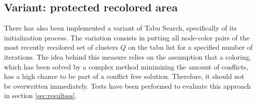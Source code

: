 \subsection{Variant: protected recolored area}
There has also been implemented a variant of Tabu Search, specifically of its initialization process. The variation consists in putting all node-color pairs of the most recently recolored set of clusters $Q$ on the tabu list for a specified number of iterations. The idea behind this measure relies on the assumption that a coloring, which has been solved by a complex method minimizing the amount of conflicts, has a high chance to be part of a conflict free solution. Therefore, it should not be overwritten immediately. Tests have been performed to evaluate this approach in section \ref{sec:resultsss}.

